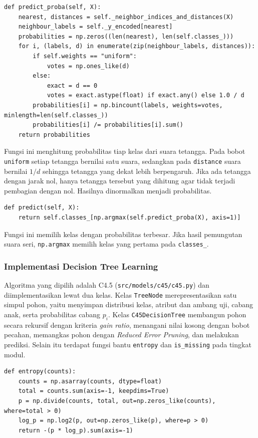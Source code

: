 \begin{lstlisting}
def predict_proba(self, X):
    nearest, distances = self._neighbor_indices_and_distances(X)
    neighbour_labels = self._y_encoded[nearest]
    probabilities = np.zeros((len(nearest), len(self.classes_)))
    for i, (labels, d) in enumerate(zip(neighbour_labels, distances)):
        if self.weights == "uniform":
            votes = np.ones_like(d)
        else:
            exact = d == 0
            votes = exact.astype(float) if exact.any() else 1.0 / d
        probabilities[i] = np.bincount(labels, weights=votes, minlength=len(self.classes_))
        probabilities[i] /= probabilities[i].sum()
    return probabilities
\end{lstlisting}

Fungsi ini menghitung probabilitas tiap kelas dari suara tetangga. Pada bobot
\texttt{uniform} setiap tetangga bernilai satu suara, sedangkan pada
\texttt{distance} suara bernilai $1/d$ sehingga tetangga yang dekat lebih
berpengaruh. Jika ada tetangga dengan jarak nol, hanya tetangga tersebut yang
dihitung agar tidak terjadi pembagian dengan nol. Hasilnya dinormalkan menjadi
probabilitas.

\begin{lstlisting}
def predict(self, X):
    return self.classes_[np.argmax(self.predict_proba(X), axis=1)]
\end{lstlisting}

Fungsi ini memilih kelas dengan probabilitas terbesar. Jika hasil pemungutan
suara seri, \texttt{np.argmax} memilih kelas yang pertama pada
\texttt{classes\_}.

\subsubsection{Implementasi Decision Tree Learning}

Algoritma yang dipilih adalah C4.5 (\texttt{src/models/c45/c45.py}) dan
diimplementasikan lewat dua kelas. Kelas \texttt{TreeNode} merepresentasikan
satu simpul pohon, yaitu menyimpan distribusi kelas, atribut dan ambang uji,
cabang anak, serta probabilitas cabang $p_i$. Kelas \texttt{C45DecisionTree}
membangun pohon secara rekursif dengan kriteria \textit{gain ratio}, menangani
nilai kosong dengan bobot pecahan, memangkas pohon dengan \textit{Reduced Error
Pruning}, dan melakukan prediksi. Selain itu terdapat fungsi bantu
\texttt{entropy} dan \texttt{is\_missing} pada tingkat modul.

\begin{lstlisting}
def entropy(counts):
    counts = np.asarray(counts, dtype=float)
    total = counts.sum(axis=-1, keepdims=True)
    p = np.divide(counts, total, out=np.zeros_like(counts), where=total > 0)
    log_p = np.log2(p, out=np.zeros_like(p), where=p > 0)
    return -(p * log_p).sum(axis=-1)
\end{lstlisting}

